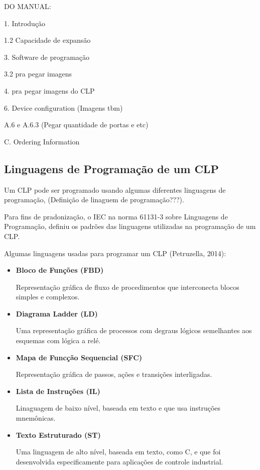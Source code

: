 \documentclass[a4paper, 12pt]{article}
\begin{document}
			DO MANUAL:
		
			1. Introdução
		
			1.2 Capacidade de expansão
		
			3. Software de programação
		
			3.2 pra pegar imagens
		
			4. pra pegar imagens do CLP
		
			6. Device configuration (Imagens tbm)
		
			A.6 e A.6.3 (Pegar quantidade de portas e etc)
		
			C. Ordering Information

	\subsection{Linguagens de Programação de um CLP}
	
		Um CLP pode ser programado usando algumas diferentes linguagens de programação, (Definição de linaguem de programação???).
		
		Para fins de pradonização, o IEC na norma 61131-3 sobre Linguagens de Programação,
		definiu os padrões das linguagens utilizadas na programação de um CLP.

		Algumas linguagens usadas para programar um CLP (Petruzella, 2014):
		
		\begin{itemize}
			\item \textbf{Bloco de Funções (FBD)}
			
				Representação gráfica de fluxo de procedimentos que interconecta blocos simples
				e complexos.
				
			\item \textbf{Diagrama Ladder (LD)}
			
				Uma representação gráfica de processos com degraus lógicos semelhantes aos esquemas
				com lógica a relé.
				
			\item \textbf{Mapa de Funcção Sequencial (SFC)}
			
				Representação gráfica de passos, ações e transições interligadas.
				
			\item \textbf{Lista de Instruções (IL)}
			
				Linaguagem de baixo nível, baseada em texto e que usa instruções mnemônicas.
				
			\item \textbf{Texto Estruturado (ST)}
			
				Uma linguagem de alto nível, baseada em texto, como C, e que foi desenvolvida
				especificamente para aplicações de controle industrial.
				
		\end{itemize}
		
\end{document}
